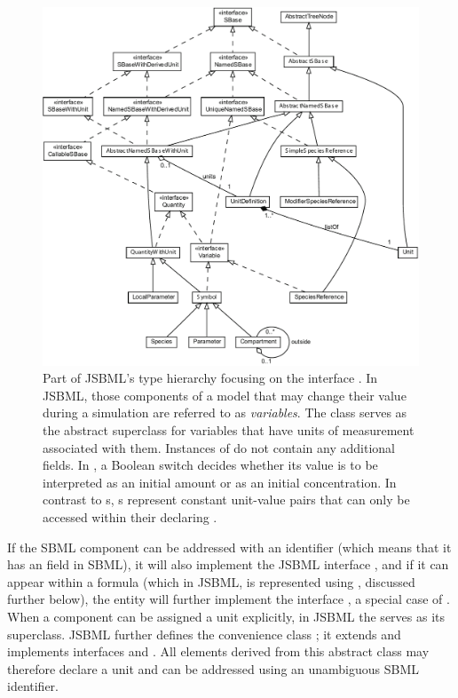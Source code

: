 \begin{figure}[b]
  \vspace*{2ex}
  \centering
  \includegraphics[width=\textwidth]{../common/img/Symbol.pdf}
  \caption[The interface \Variable]{Part of JSBML's type
    hierarchy focusing on the interface \Variable.  In JSBML,
    those components of a model that may change their value during a
    simulation are referred to as \emph{variables}. The class \Symbol serves
    as the abstract superclass for variables that have units of measurement
    associated with them. Instances of \Parameter do not contain any
    additional fields. In \Species, a Boolean switch decides whether its
    value is to be interpreted as an initial amount or as an initial
    concentration. In contrast to \Variable{}s, \LocalParameter{}s represent
    constant unit-value pairs that can only be accessed within their
    declaring \KineticLaw. }
 \label{fig:Variable}
\end{figure}


If the SBML component can be addressed with an identifier (which means that
it has an  field in SBML), it will also implement the JSBML
interface \NamedSBaseWithDerivedUnit, and if it can appear within a formula
(which in JSBML, is represented using \ASTNode, discussed further below),
the entity will further implement the interface \CallableSBase, a special
case of .  When a component can be assigned
a unit explicitly, in JSBML the \SBaseWithUnit serves as its superclass.
JSBML further defines the convenience class \AbstractNamedSBaseWithUnit; it
extends \AbstractNamedSBase and implements interfaces \SBaseWithUnit
and \NamedSBaseWithDerivedUnit.  All elements derived from this abstract
class may therefore declare a unit and can be addressed using an
unambiguous SBML identifier.

